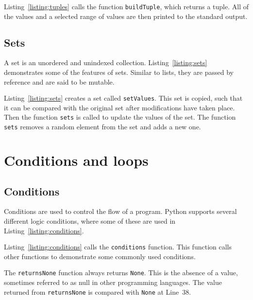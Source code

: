\documentclass[11pt,a4paper]{article}
\begin{document}


Listing~\ref{listing:tuples} calls the function \texttt{buildTuple}, which returns a tuple.  All of the values and a selected range of values are then printed to the standard output.

\subsection{Sets}

A set is an unordered and unindexed collection.  Listing~\ref{listing:sets} demonstrates some of the features of sets.  Similar to lists, they are passed by reference and are said to be mutable.



Listing~\ref{listing:sets} creates a set called \texttt{setValues}.  This set is copied, such that it can be compared with the original set after modifications have taken place.  Then the function \texttt{sets} is called to update the values of the set.  The function \texttt{sets} removes a random element from the set and adds a new one.

\section{Conditions and loops}

\subsection{Conditions \label{section:conditions}}

Conditions are used to control the flow of a program.  Python supports several different logic conditions, where some of these are used in Listing~\ref{listing:conditions}.



Listing~\ref{listing:conditions} calls the \texttt{conditions} function.  This function calls other functions to demonstrate some commonly used conditions.

The \texttt{returnsNone} function always returns \texttt{None}.  This is the absence of a value, sometimes referred to as null in other programming languages.  The value returned from \texttt{returnsNone} is compared with \texttt{None} at Line~38.
\end{document}
